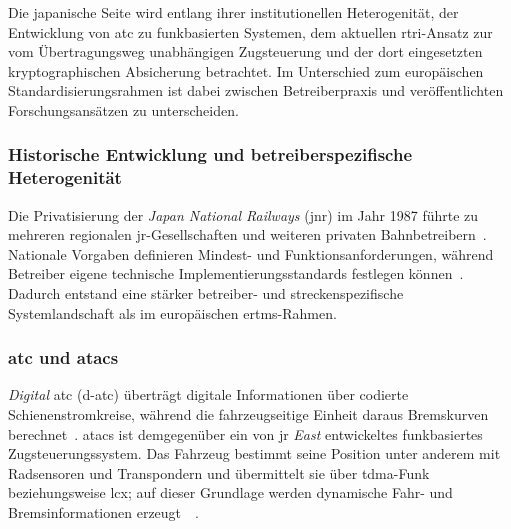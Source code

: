 \documentclass[runningheads]{res/llncs}
\begin{document}
Die japanische Seite wird entlang ihrer institutionellen Heterogenität, der Entwicklung von \gls{atc} zu funkbasierten Systemen, dem aktuellen \gls{rtri}-Ansatz zur vom Übertragungsweg unabhängigen Zugsteuerung und der dort eingesetzten kryptographischen Absicherung betrachtet. Im Unterschied zum europäischen Standardisierungsrahmen ist dabei zwischen Betreiberpraxis und veröffentlichten Forschungsansätzen zu unterscheiden.

\subsubsection{Historische Entwicklung und betreiberspezifische Heterogenität}
\label{sec:Historische_Entwicklung_und_betreiberspezifische_Heterogenität}
Die Privatisierung der \textit{Japan National Railways} (\gls{jnr}) im Jahr 1987 führte zu mehreren regionalen \gls{jr}-Gesellschaften und weiteren privaten Bahnbetreibern~\parencite{yanaseJapanese2011}. Nationale Vorgaben definieren Mindest- und Funktionsanforderungen, während Betreiber eigene technische Implementierungsstandards festlegen können~\parencite{yanaseJapanese2011}. Dadurch entstand eine stärker betreiber- und streckenspezifische Systemlandschaft als im europäischen \gls{ertms}-Rahmen.

\subsubsection{\texorpdfstring{\gls{atc} und \gls{atacs}}{ATC und ATACS}}
\label{sec:ATC_und_ATACS}
\textit{Digital} \gls{atc} (\gls{d-atc}) überträgt digitale Informationen über codierte Schienenstromkreise, während die fahrzeugseitige Einheit daraus Bremskurven berechnet~\parencite[S. 44--45]{h.tsukisawaStandardization2024}. \gls{atacs} ist demgegenüber ein von \gls{jr} \textit{East} entwickeltes funkbasiertes Zugsteuerungssystem. Das Fahrzeug bestimmt seine Position unter anderem mit Radsensoren und Transpondern und übermittelt sie über \gls{tdma}-Funk beziehungsweise \gls{lcx}; auf dieser Grundlage werden dynamische Fahr- und Bremsinformationen erzeugt~\parencite[S. 13--14]{xiangliuCyber2020}~\parencite[S. 6, 8]{iwamotoTrain2024}.
\end{document}
